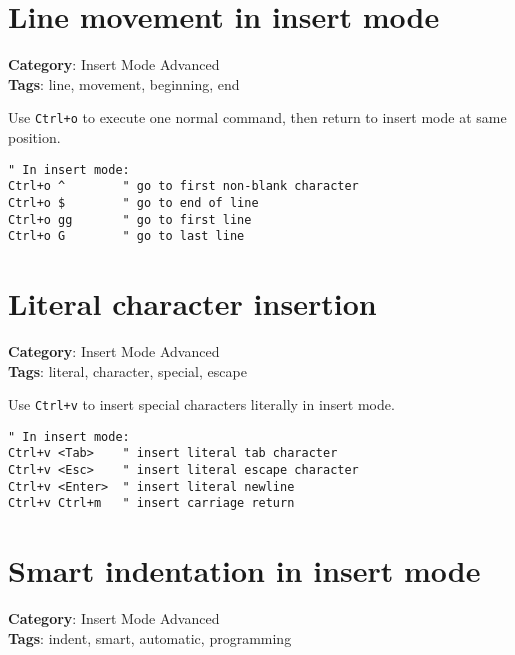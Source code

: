 {{{{{{\section{Line movement in insert mode}

\textbf{Category}: Insert Mode Advanced\\ \textbf{Tags}: line, movement, beginning, end
\vspace{0.5cm}

Use {\footnotesize \Verb§Ctrl+o§} to execute one normal command, then return to insert mode at same position.

\begin{Exa*}{}
\begin{Verbatim}[fontsize=\footnotesize, breaklines, breakanywhere]
" In insert mode:
Ctrl+o ^        " go to first non-blank character
Ctrl+o $        " go to end of line
Ctrl+o gg       " go to first line
Ctrl+o G        " go to last line
\end{Verbatim}
\end{Exa*}

\section{Literal character insertion}

\textbf{Category}: Insert Mode Advanced\\ \textbf{Tags}: literal, character, special, escape
\vspace{0.5cm}

Use {\footnotesize \Verb§Ctrl+v§} to insert special characters literally in insert mode.

\begin{Exa*}{}
\begin{Verbatim}[fontsize=\footnotesize, breaklines, breakanywhere]
" In insert mode:
Ctrl+v <Tab>    " insert literal tab character
Ctrl+v <Esc>    " insert literal escape character
Ctrl+v <Enter>  " insert literal newline
Ctrl+v Ctrl+m   " insert carriage return
\end{Verbatim}
\end{Exa*}

\section{Smart indentation in insert mode}

\textbf{Category}: Insert Mode Advanced\\ \textbf{Tags}: indent, smart, automatic, programming
\vspace{0.5cm}

}}}}}}
